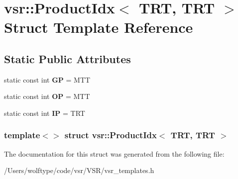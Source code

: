 \hypertarget{structvsr_1_1_product_idx_3_01_t_r_t_00_01_t_r_t_01_4}{\section{vsr\-:\-:Product\-Idx$<$ T\-R\-T, T\-R\-T $>$ Struct Template Reference}
\label{structvsr_1_1_product_idx_3_01_t_r_t_00_01_t_r_t_01_4}
}
\subsection*{Static Public Attributes}
\begin{DoxyCompactItemize}
\item 
\hypertarget{structvsr_1_1_product_idx_3_01_t_r_t_00_01_t_r_t_01_4_a4c3948dc0e7f1bb326b28187a4ae97bd}{static const int {\bfseries G\-P} = M\-T\-T}\label{structvsr_1_1_product_idx_3_01_t_r_t_00_01_t_r_t_01_4_a4c3948dc0e7f1bb326b28187a4ae97bd}

\item 
\hypertarget{structvsr_1_1_product_idx_3_01_t_r_t_00_01_t_r_t_01_4_a1d0f28f1604131a377c9faa0eeba31c7}{static const int {\bfseries O\-P} = M\-T\-T}\label{structvsr_1_1_product_idx_3_01_t_r_t_00_01_t_r_t_01_4_a1d0f28f1604131a377c9faa0eeba31c7}

\item 
\hypertarget{structvsr_1_1_product_idx_3_01_t_r_t_00_01_t_r_t_01_4_acc74a8a915278fa319f0a39e845c7f67}{static const int {\bfseries I\-P} = T\-R\-T}\label{structvsr_1_1_product_idx_3_01_t_r_t_00_01_t_r_t_01_4_acc74a8a915278fa319f0a39e845c7f67}

\end{DoxyCompactItemize}
\subsubsection*{template$<$$>$ struct vsr\-::\-Product\-Idx$<$ T\-R\-T, T\-R\-T $>$}



The documentation for this struct was generated from the following file\-:\begin{DoxyCompactItemize}
\item 
/\-Users/wolftype/code/vsr/\-V\-S\-R/vsr\-\_\-templates.\-h\end{DoxyCompactItemize}
